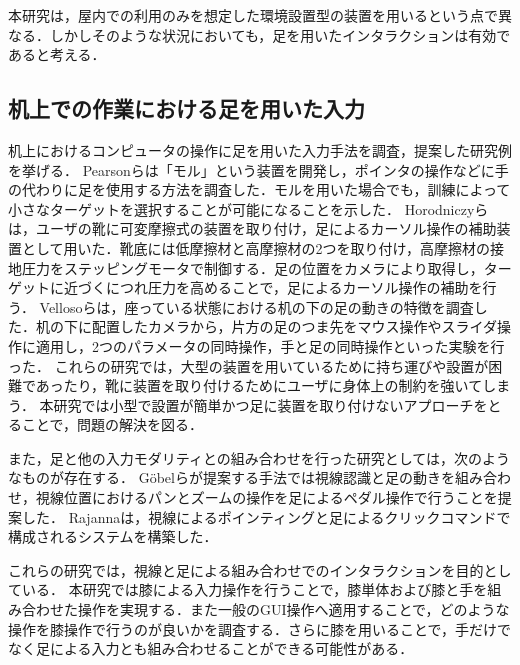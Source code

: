 \documentclass[submit, techrep]{ipsj}
\begin{document}
本研究は，屋内での利用のみを想定した環境設置型の装置を用いるという点で異なる．しかしそのような状況においても，足を用いたインタラクションは有効であると考える．


\subsection{机上での作業における足を用いた入力}
机上におけるコンピュータの操作に足を用いた入力手法を調査，提案した研究例を挙げる．
Pearsonら\cite{Pearson:1986:MMD:22627.22392, Pearson:1988:EEP:57167.57169}は「モル」という装置を開発し，ポインタの操作などに手の代わりに足を使用する方法を調査した．モルを用いた場合でも，訓練によって小さなターゲットを選択することが可能になることを示した．
Horodniczyら\cite{Horodniczy:2017:FHE:3025453.3025625}は，ユーザの靴に可変摩擦式の装置を取り付け，足によるカーソル操作の補助装置として用いた．靴底には低摩擦材と高摩擦材の2つを取り付け，高摩擦材の接地圧力をステッピングモータで制御する．足の位置をカメラにより取得し，ターゲットに近づくにつれ圧力を高めることで，足によるカーソル操作の補助を行う．
Vellosoら\cite{velloso:hal-01599657}は，座っている状態における机の下の足の動きの特徴を調査した．机の下に配置したカメラから，片方の足のつま先をマウス操作やスライダ操作に適用し，2つのパラメータの同時操作，手と足の同時操作といった実験を行った．
これらの研究では，大型の装置を用いているために持ち運びや設置が困難であったり，靴に装置を取り付けるためにユーザに身体上の制約を強いてしまう．
本研究では小型で設置が簡単かつ足に装置を取り付けないアプローチをとることで，問題の解決を図る．\par
また，足と他の入力モダリティとの組み合わせを行った研究としては，次のようなものが存在する．
G\"{o}belら\cite{Gobel:2013:GFI:2468356.2479610}が提案する手法では視線認識と足の動きを組み合わせ，視線位置におけるパンとズームの操作を足によるペダル操作で行うことを提案した．
Rajanna\cite{Rajanna:2016:GFI:2876456.2876462}は，視線によるポインティングと足によるクリックコマンドで構成されるシステムを構築した．\par
これらの研究では，視線と足による組み合わせでのインタラクションを目的としている．
本研究では膝による入力操作を行うことで，膝単体および膝と手を組み合わせた操作を実現する．また一般のGUI操作へ適用することで，どのような操作を膝操作で行うのが良いかを調査する．さらに膝を用いることで，手だけでなく足による入力とも組み合わせることができる可能性がある．
\end{document}
